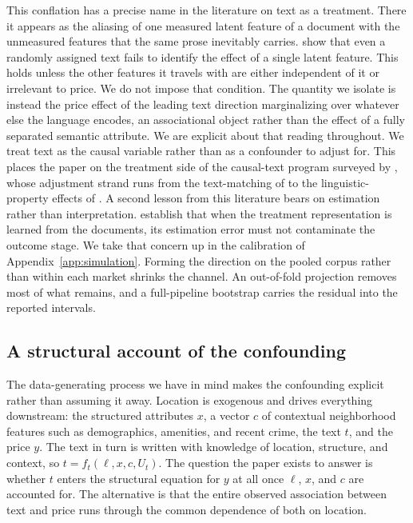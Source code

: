 This conflation has a precise name in the literature on text as a treatment.
There it appears as the aliasing of one measured latent feature of a document with
the unmeasured features that the same prose inevitably carries.
\citet{fong2023latent} show that even a randomly assigned text fails to identify
the effect of a single latent feature. This holds unless the other features it
travels with are either independent of it or irrelevant to price. We do not
impose that condition. The quantity we isolate is instead the price effect of the
leading text direction marginalizing over whatever else the language encodes, an
associational object rather than the effect of a fully separated semantic
attribute. We are explicit about that reading throughout. We treat text as the
causal variable rather than as a confounder to adjust for. This places the paper
on the treatment side of the causal-text program surveyed by \citet{keith2020text},
whose adjustment strand runs from the text-matching of \citet{roberts2020adjusting}
to the linguistic-property effects of \citet{pryzant2021causal}. A second lesson
from this literature bears on estimation rather than interpretation.
\citet{egami2022texts} establish that when the treatment representation is learned
from the documents, its estimation error must not contaminate the outcome stage.
We take that concern up in the calibration of Appendix~\ref{app:simulation}.
Forming the direction on the pooled corpus rather than within each market shrinks
the channel. An out-of-fold projection removes most of what remains, and a
full-pipeline bootstrap carries the residual into the reported intervals.

\subsection{A structural account of the confounding}

The data-generating process we have in mind makes the confounding explicit rather
than assuming it away. Location is exogenous and drives everything downstream: the
structured attributes $x$, a vector $c$ of contextual neighborhood features such
as demographics, amenities, and recent crime, the text $t$, and the price $y$. The
text in turn is written with knowledge of location, structure, and context, so
$t = f_t(\ell, x, c, U_t)$. The question the paper exists to answer is whether
$t$ enters the structural equation for $y$ at all once $\ell$, $x$, and $c$ are
accounted for. The alternative is that the entire observed association between
text and price runs through the common dependence of both on location.

